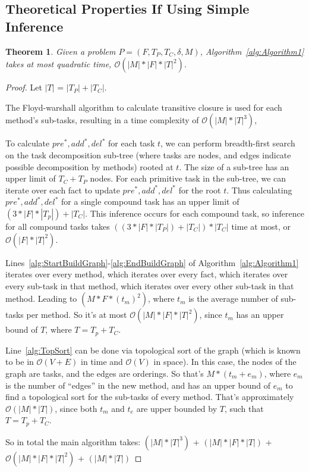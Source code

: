 \documentclass[letterpaper]{article} %
\newtheorem{theorem}{Theorem}
\newcommand{\PreS} {\ensuremath{\mathit{pre^{*}}}}
\newcommand{\AddS} {\ensuremath{\mathit{add^{*}}}}
\newcommand{\DelS} {\ensuremath{\mathit{del^{*}}}}
\begin{document}
\subsection{Theoretical Properties If Using Simple Inference}
\begin{theorem}\label{thm:Runtime}
	Given a problem $P = (F, T_P, T_C, \delta, M)$, Algorithm~\ref{alg:Algorithm1} takes at most quadratic time, $\mathcal{O}( |M| * |F| * |T|^2)$. 
\end{theorem}
\begin{proof}  %
	Let $|T|$ = $|T_P| + |T_C|$.
	
	The Floyd-warshall algorithm to calculate transitive closure is used for each method's sub-tasks, resulting in a time complexity of $\mathcal{O}(|M| * |T|^3)$, 
	
	
	To calculate $\PreS, \AddS, \DelS$ for each task $t$, we can perform breadth-first search on the task decomposition sub-tree (where tasks are nodes, and edges indicate possible decomposition by methods) rooted at $t$. The size of a sub-tree has an upper limit of $T_C + T_P$ nodes. For each primitive task in the sub-tree, we can iterate over each fact to update $\PreS, \AddS, \DelS$ for the root $t$. Thus calculating  $\PreS, \AddS, \DelS$ for a single compound task has an upper limit of $(3 * |F| * |T_p|) + |T_C|$. This inference occurs for each compound task, so inference for all compound tasks takes $((3 * |F| * |T_P|) + |T_C|) * |T_C|$ time at most, or $\mathcal{O}(|F| * |T|^2)$.
	
	Lines~\ref{alg:StartBuildGraph}-\ref{alg:EndBuildGraph} of Algorithm~\ref{alg:Algorithm1} iterates over every method, which iterates over every fact, which iterates over every sub-task in that method, which iterates over every other sub-task in that method. Leading to $(M * F * (t_m)^2)$, where $t_m$ is the average number of sub-tasks per method. So it's at most $\mathcal{O}(|M| * |F| * |T|^2)$, since $t_m$ has an upper bound of $T$, where $T=T_p + T_C$.		
	
	Line~\ref{alg:TopSort} can be done via topological sort of the graph (which is known to be in $\mathcal{O}(V+E)$ in time and $\mathcal{O}(V)$ in space). In this case, the nodes of the graph are tasks, and the edges are orderings. So that's $M * (t_m+e_m)$, where $e_m$ is the number of \enquote{edges} in the new method, and has an upper bound of $e_m$ to find a topological sort for the sub-tasks of every method. That's approximately $\mathcal{O}(|M| * |T|)$, since both $t_m$ and $t_e$ are upper bounded by $T$, such that $T=T_p + T_C$.
	
	So in total the main algorithm takes: \newline
	$(|M| * |T|^3)$ +          %
	$(|M| * |F| * |T|)$  +    %
	$\mathcal{O}(|M| * |F| * |T|^2)$ +  %
	$(|M| * |T|)$        %
\end{proof}
\end{document}
